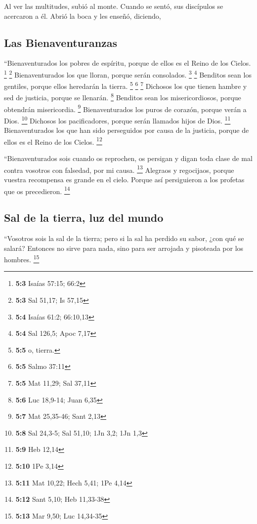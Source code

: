 \begin{paracol}{2}
 Al ver las multitudes, subió al monte. Cuando se sentó,
sus discípulos se acercaron a él.  Abrió la boca y les
enseñó, diciendo,

\hypertarget{las-bienaventuranzas}{%
\subsection{Las Bienaventuranzas}\label{las-bienaventuranzas}}

 ``Bienaventurados los pobres de espíritu, porque de ellos
es el Reino de los Cielos. \footnote{\textbf{5:3} Isaías 57:15; 66:2}
\footnote{\textbf{5:3} Sal 51,17; Is 57,15} 
Bienaventurados los que lloran, porque serán consolados. \footnote{\textbf{5:4}
  Isaías 61:2; 66:10,13} \footnote{\textbf{5:4} Sal 126,5; Apoc 7,17}
 Benditos sean los gentiles, porque ellos heredarán la
tierra. \footnote{\textbf{5:5} o, tierra.} \footnote{\textbf{5:5} Salmo
  37:11} \footnote{\textbf{5:5} Mat 11,29; Sal 37,11} 
Dichosos los que tienen hambre y sed de justicia, porque se llenarán.
\footnote{\textbf{5:6} Luc 18,9-14; Juan 6,35}  Benditos
sean los misericordiosos, porque obtendrán misericordia. \footnote{\textbf{5:7}
  Mat 25,35-46; Sant 2,13}  Bienaventurados los puros de
corazón, porque verán a Dios. \footnote{\textbf{5:8} Sal 24,3-5; Sal
  51,10; 1Jn 3,2; 1Jn 1,3}  Dichosos los pacificadores,
porque serán llamados hijos de Dios. \footnote{\textbf{5:9} Heb 12,14}
 Bienaventurados los que han sido perseguidos por causa
de la justicia, porque de ellos es el Reino de los Cielos. \footnote{\textbf{5:10}
  1Pe 3,14}

 ``Bienaventurados sois cuando os reprochen, os persigan
y digan toda clase de mal contra vosotros con falsedad, por mi causa.
\footnote{\textbf{5:11} Mat 10,22; Hech 5,41; 1Pe 4,14} 
Alegraos y regocijaos, porque vuestra recompensa es grande en el cielo.
Porque así persiguieron a los profetas que os precedieron. \footnote{\textbf{5:12}
  Sant 5,10; Heb 11,33-38}

\hypertarget{sal-de-la-tierra-luz-del-mundo}{%
\subsection{Sal de la tierra, luz del
mundo}\label{sal-de-la-tierra-luz-del-mundo}}

 ``Vosotros sois la sal de la tierra; pero si la sal ha
perdido su sabor, ¿con qué se salará? Entonces no sirve para nada, sino
para ser arrojada y pisoteada por los hombres. \footnote{\textbf{5:13}
  Mar 9,50; Luc 14,34-35}


\end{paracol}
